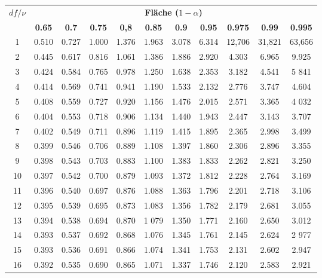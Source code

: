\documentclass[11pt,a4paper]{article}
\begin{document}
\begin{table}[h]
	\centering
	\begin{tabular}{|c||c|c|c|c|c|c|c|c|c|c|}
		\hline
		\multirow{2}{*}{\textbf{$df / \nu$}} & \multicolumn{10}{c|}{\textbf{Fläche ($1-\alpha$)}} \\ \cline{2-11}
 			& \textbf{0.65} & \textbf{0.7} & \textbf{0.75} & \textbf{0,8} & \textbf{0.85} & \textbf{0.9} & \textbf{0.95} & \textbf{0.975} & \textbf{0.99} & \textbf{0.995} \\
		\hline
		\hline
		1	& 0.510	& 0.727	& 1.000	& 1.376	& 1.963	& 3.078	& 6.314	& 12,706	& 31,821	& 63,656 \\
		\hline
		2	& 0.445	& 0.617	& 0.816	& 1.061	& 1.386	& 1.886	& 2.920	& 4.303	& 6.965	& 9.925 \\
		\hline
		3	& 0.424	& 0.584	& 0.765	& 0.978	& 1.250	& 1.638	& 2.353	& 3.182	& 4.541	& 5
		841\\
		\hline
		4	& 0.414	& 0.569	& 0.741	& 0.941	& 1.190	& 1.533	& 2.132	& 2.776	& 3.747	& 4.604\\
		\hline
		5	& 0.408	& 0.559	& 0.727	& 0.920	& 1.156	& 1.476	& 2.015	& 2.571	& 3.365	& 4
		032\\
		\hline
		6	& 0.404	& 0.553	& 0.718	& 0.906	& 1.134	& 1.440	& 1.943	& 2.447	& 3.143	& 3.707\\
		\hline
		7	& 0.402	& 0.549	& 0.711	& 0.896	& 1.119	& 1.415	& 1.895	& 2.365	& 2.998	& 3.499\\
		\hline
		8	& 0.399	& 0.546	& 0.706	& 0.889	& 1.108	& 1.397	& 1.860	& 2.306	& 2.896	& 3.355\\
		\hline
		9	& 0.398	& 0.543	& 0.703	& 0.883	& 1.100	& 1.383	& 1.833	& 2.262	& 2.821	& 3.250\\
		\hline
		10	& 0.397	& 0.542	& 0.700	& 0.879	& 1.093	& 1.372	& 1.812	& 2.228	& 2.764	& 3.169\\
		\hline
		11	& 0.396	& 0.540	& 0.697	& 0.876	& 1.088	& 1.363	& 1.796	& 2.201	& 2.718	& 3.106\\
		\hline
		12	& 0.395	& 0.539	& 0.695	& 0.873	& 1.083	& 1.356	& 1.782	& 2.179	& 2.681	& 3.055\\
		\hline
		13	& 0.394	& 0.538	& 0.694	& 0.870	& 1
		079	& 1.350	& 1.771	& 2.160	& 2.650	& 3.012\\
		\hline
		14	& 0.393	& 0.537	& 0.692	& 0.868	& 1.076	& 1.345	& 1.761	& 2.145	& 2.624	& 2
		977\\
		\hline
		15	& 0.393	& 0.536	& 0.691	& 0.866	& 1.074	& 1.341	& 1.753	& 2.131	& 2.602	& 2.947\\
		\hline
		16	& 0.392	& 0.535	& 0.690	& 0.865	& 1.071	& 1.337	& 1.746	& 2.120	& 2.583	& 2.921\\

\end{tabular}
\end{table}
\end{document}
